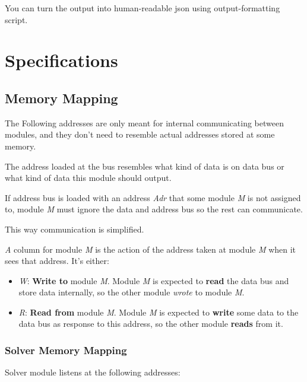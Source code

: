 \documentclass[12pt]{extarticle}
\begin{document}
You can turn the output into human-readable json using output-formatting script.

\section{Specifications}

\subsection{Memory Mapping}
The Following addresses are only meant for internal communicating between modules, and they don't need to resemble actual addresses stored at some memory. 

The address loaded at the bus resembles what kind of data is on data bus or what kind of data this module should output.

If address bus is loaded with an address \emph{Adr} that some module \emph{M} is not assigned to, module \emph{M} must ignore the data and address bus so the rest can communicate.

This way communication is simplified.

\emph{A} column for module \emph{M} is the action of the address taken at module \emph{M} when it sees that address. It's either:

\begin{itemize}
    \item \emph{W}: \textbf{Write to} module \emph{M}. Module \emph{M} is expected to \textbf{read} the data bus and store data internally, so the other module \emph{wrote} to module \emph{M}.
    \item \emph{R}: \textbf{Read from} module \emph{M}. Module \emph{M} is expected to \textbf{write} some data to the data bus as response to this address, so the other module \textbf{reads} from it.
\end{itemize}

\subsubsection{Solver Memory Mapping}
Solver module listens at the following addresses:
\end{document}
